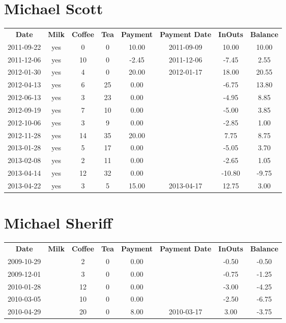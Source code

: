 \section{Michael Scott}

\begin{center}
\begin{tabular}{cccccccc}
\textbf{Date} & \textbf{Milk} & \textbf{Coffee} & \textbf{Tea} & \textbf{Payment} & \textbf{Payment Date} & \textbf{InOuts} & \textbf{Balance} \\
2011-09-22 & yes &  0 &  0 & 10.00 & 2011-09-09 &  10.00 & 10.00\\ 
2011-12-06 & yes & 10 &  0 & -2.45 & 2011-12-06 &  -7.45 &  2.55\\ 
2012-01-30 & yes &  4 &  0 & 20.00 & 2012-01-17 &  18.00 & 20.55\\ 
2012-04-13 & yes &  6 & 25 &  0.00 &  &  -6.75 & 13.80\\ 
2012-06-13 & yes &  3 & 23 &  0.00 &  &  -4.95 &  8.85\\ 
2012-09-19 & yes &  7 & 10 &  0.00 &  &  -5.00 &  3.85\\ 
2012-10-06 & yes &  3 &  9 &  0.00 &  &  -2.85 &  1.00\\ 
2012-11-28 & yes & 14 & 35 & 20.00 &  &   7.75 &  8.75\\ 
2013-01-28 & yes &  5 & 17 &  0.00 &  &  -5.05 &  3.70\\ 
2013-02-08 & yes &  2 & 11 &  0.00 &  &  -2.65 &  1.05\\ 
2013-04-14 & yes & 12 & 32 &  0.00 &  & -10.80 & -9.75\\ 
2013-04-22 & yes &  3 &  5 & 15.00 & 2013-04-17 &  12.75 &  3.00
\end{tabular}
\end{center}

\section{Michael Sheriff}

\begin{center}
\begin{tabular}{cccccccc}
\textbf{Date} & \textbf{Milk} & \textbf{Coffee} & \textbf{Tea} & \textbf{Payment} & \textbf{Payment Date} & \textbf{InOuts} & \textbf{Balance} \\
2009-10-29 &  &  2 & 0 & 0.00 &  & -0.50 & -0.50\\ 
2009-12-01 &  &  3 & 0 & 0.00 &  & -0.75 & -1.25\\ 
2010-01-28 &  & 12 & 0 & 0.00 &  & -3.00 & -4.25\\ 
2010-03-05 &  & 10 & 0 & 0.00 &  & -2.50 & -6.75\\ 
2010-04-29 &  & 20 & 0 & 8.00 & 2010-03-17 &  3.00 & -3.75
\end{tabular}
\end{center}

